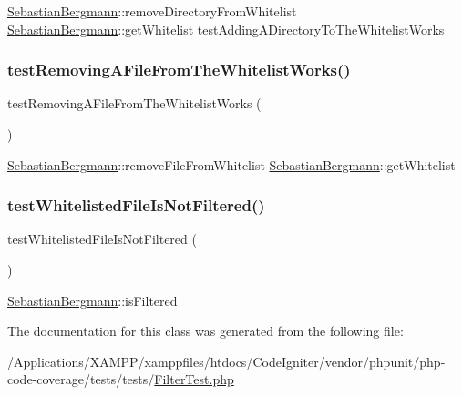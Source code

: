 \mbox{\hyperlink{namespace_sebastian_bergmann}{Sebastian\+Bergmann}}\+::remove\+Directory\+From\+Whitelist  \mbox{\hyperlink{namespace_sebastian_bergmann}{Sebastian\+Bergmann}}\+::get\+Whitelist  test\+Adding\+A\+Directory\+To\+The\+Whitelist\+Works \mbox{\label{class_sebastian_bergmann_1_1_code_coverage_1_1_filter_test_a2f4c0d5028c0f70ce6f5b103016c7f55}} 
\subsubsection{\texorpdfstring{test\+Removing\+A\+File\+From\+The\+Whitelist\+Works()}{testRemovingAFileFromTheWhitelistWorks()}}
{\footnotesize\ttfamily test\+Removing\+A\+File\+From\+The\+Whitelist\+Works (\begin{DoxyParamCaption}{ }\end{DoxyParamCaption})}

\mbox{\hyperlink{namespace_sebastian_bergmann}{Sebastian\+Bergmann}}\+::remove\+File\+From\+Whitelist  \mbox{\hyperlink{namespace_sebastian_bergmann}{Sebastian\+Bergmann}}\+::get\+Whitelist \mbox{\label{class_sebastian_bergmann_1_1_code_coverage_1_1_filter_test_ab24c6f9f8ee1d57d46a38b69cee91b2b}} 
\subsubsection{\texorpdfstring{test\+Whitelisted\+File\+Is\+Not\+Filtered()}{testWhitelistedFileIsNotFiltered()}}
{\footnotesize\ttfamily test\+Whitelisted\+File\+Is\+Not\+Filtered (\begin{DoxyParamCaption}{ }\end{DoxyParamCaption})}

\mbox{\hyperlink{namespace_sebastian_bergmann}{Sebastian\+Bergmann}}\+::is\+Filtered 

The documentation for this class was generated from the following file\+:\begin{DoxyCompactItemize}
\item 
/\+Applications/\+X\+A\+M\+P\+P/xamppfiles/htdocs/\+Code\+Igniter/vendor/phpunit/php-\/code-\/coverage/tests/tests/\mbox{\hyperlink{_filter_test_8php}{Filter\+Test.\+php}}\end{DoxyCompactItemize}
